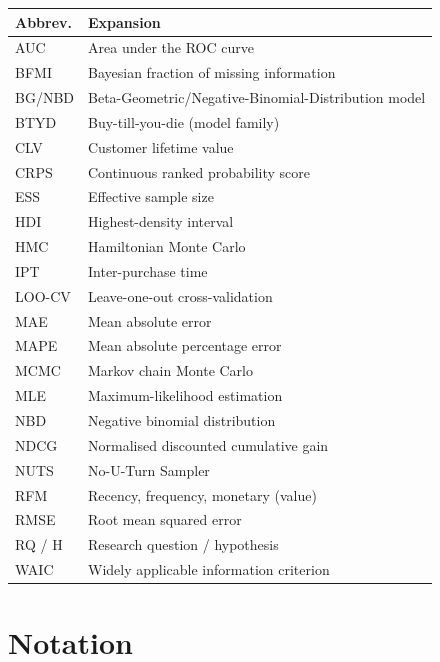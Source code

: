 \documentclass[12pt, a4paper, oneside]{report}
\begin{document}
\begin{longtable}{@{}p{2.6cm}p{\dimexpr\linewidth-3.1cm\relax}@{}}
  \toprule
  \textbf{Abbrev.} & \textbf{Expansion} \\
  \midrule
  \endhead
  AUC      & Area under the ROC curve \\
  BFMI     & Bayesian fraction of missing information \\
  BG/NBD   & Beta-Geometric/Negative-Binomial-Distribution model \\
  BTYD     & Buy-till-you-die (model family) \\
  CLV      & Customer lifetime value \\
  CRPS     & Continuous ranked probability score \\
  ESS      & Effective sample size \\
  HDI      & Highest-density interval \\
  HMC      & Hamiltonian Monte Carlo \\
  IPT      & Inter-purchase time \\
  LOO-CV   & Leave-one-out cross-validation \\
  MAE      & Mean absolute error \\
  MAPE     & Mean absolute percentage error \\
  MCMC     & Markov chain Monte Carlo \\
  MLE      & Maximum-likelihood estimation \\
  NBD      & Negative binomial distribution \\
  NDCG     & Normalised discounted cumulative gain \\
  NUTS     & No-U-Turn Sampler \\
  RFM      & Recency, frequency, monetary (value) \\
  RMSE     & Root mean squared error \\
  RQ / H   & Research question / hypothesis \\
  WAIC     & Widely applicable information criterion \\
  \bottomrule
\end{longtable}

\clearpage
\chapter*{Notation}
\end{document}

